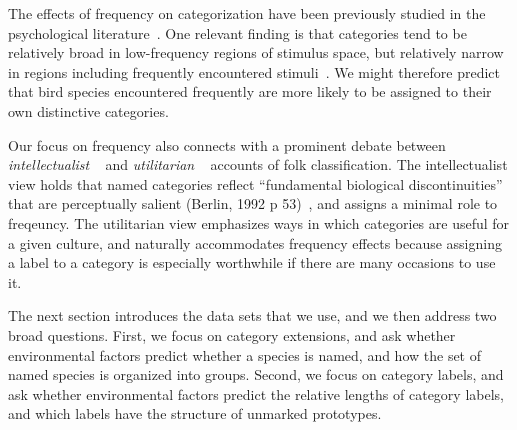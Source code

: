 \documentclass[10pt,letterpaper]{article}
\begin{document}
The effects of frequency on categorization have been previously studied in the psychological literature~\cite{parducci83,nosofsky88,barsalouhl98}.  One relevant finding is that categories tend to be relatively broad in low-frequency regions of stimulus space, but relatively narrow in regions including frequently encountered stimuli~\cite{parducci83}. We might therefore predict that bird species encountered frequently are more likely to be assigned to their own distinctive categories.  

Our focus on frequency also connects with a prominent debate between \emph{intellectualist} ~\cite{berlin2014ethnobiological} and \emph{utilitarian} ~\cite{hunn1982utilitarian} accounts of folk classification. The intellectualist view holds that named categories reflect ``fundamental biological discontinuities'' that are perceptually salient (Berlin, 1992 p 53)~\nocite{berlin2014ethnobiological}, and assigns a minimal role to freqeuncy. The utilitarian view emphasizes ways in which categories are useful for a given culture, and naturally accommodates frequency effects because assigning a label to a category is especially worthwhile if there are many occasions to use it.

The next section introduces the data sets that we use, and we then address two broad questions. First, we focus on category extensions, and ask whether environmental factors predict whether a species is named, and how the set of named species is organized into groups. Second, we focus on category labels, and ask whether environmental factors predict the relative lengths of category labels, and which labels have the structure of unmarked prototypes. 




\end{document}
